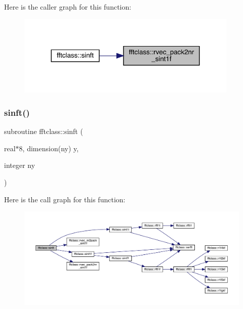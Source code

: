 Here is the caller graph for this function\+:\nopagebreak
\begin{figure}[H]
\begin{center}
\leavevmode
\includegraphics[width=299pt]{namespacefftclass_a667b3d13eccd40bf9e60f379f6d44e04_icgraph}
\end{center}
\end{figure}
\mbox{\label{namespacefftclass_abcd5ef700f07a29fa9949e15866f5d41}} 
\subsubsection{\texorpdfstring{sinft()}{sinft()}}
{\footnotesize\ttfamily subroutine fftclass\+::sinft (\begin{DoxyParamCaption}\item[{real$\ast$8, dimension(ny)}]{y,  }\item[{integer}]{ny }\end{DoxyParamCaption})}

Here is the call graph for this function\+:\nopagebreak
\begin{figure}[H]
\begin{center}
\leavevmode
\includegraphics[width=350pt]{namespacefftclass_abcd5ef700f07a29fa9949e15866f5d41_cgraph}
\end{center}
\end{figure}
\mbox{\label{namespacefftclass_a6770a2a0c7bdf09af5ed719175fb4ca4}} 
